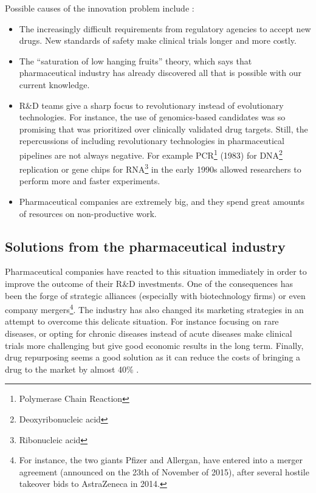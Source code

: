 Possible causes of the innovation problem include \cite{hughes_innovation_2007}:

\begin{itemize}

\item The increasingly difficult requirements from regulatory agencies to accept new drugs. New standards of safety make clinical trials longer and more costly.

\item The ``saturation of low hanging fruits'' theory, which says that pharmaceutical industry has already discovered all that is possible with our current knowledge.

\item R\&D teams give a sharp focus to revolutionary instead of evolutionary technologies. For instance, the use of genomics-based candidates was so promising that was prioritized over clinically validated drug targets. Still, the repercussions of including revolutionary technologies in pharmaceutical pipelines are not always negative. For example PCR\footnote{Polymerase Chain Reaction} (1983) for DNA\footnote{Deoxyribonucleic acid} replication or gene chips for RNA\footnote{Ribonucleic acid } in the early 1990s allowed researchers to perform more and faster experiments.  

\item Pharmaceutical companies are extremely big, and they spend great amounts of resources on non-productive work.
\end{itemize}

\subsection{Solutions from the pharmaceutical industry }

Pharmaceutical companies have reacted to this situation immediately in order to improve the outcome of their R\&D investments. One of the consequences has been the forge of strategic alliances (especially with biotechnology firms) or even company mergers\footnote{ For instance, the two giants Pfizer and Allergan, have entered into a merger agreement (announced on the 23th of November of 2015), after several hostile takeover bids to AstraZeneca in 2014.}. The industry has also changed its marketing strategies in an attempt to overcome this delicate situation. For instance focusing on rare diseases, or opting for chronic diseases instead of acute diseases make clinical trials more challenging but give good economic results in the long term. 
Finally, drug repurposing seems a good solution as it can reduce the costs of bringing a drug to the market by almost 40\% \cite{chong_new_2007}.

